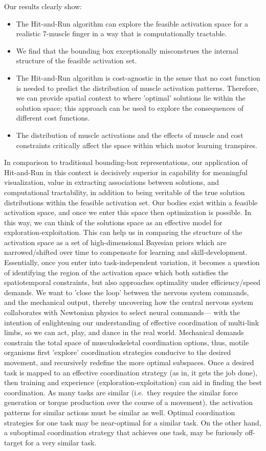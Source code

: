 Our results clearly show:
\begin{itemize}
	\item{The Hit-and-Run algorithm can explore the feasible activation space for a realistic 7-muscle finger in a way that is computationally tractable.}
	\item{We find that the bounding box exceptionally misconstrues the internal structure of the feasible activation set.}
	\item{The Hit-and-Run algorithm is cost-agnostic in the sense that no cost function is needed to predict the distribution of muscle activation patterns. Therefore, we can provide spatial context to where 'optimal' solutions lie within the solution space; this approach can be used to explore the consequences of different cost functions.}
	\item{The distribution of muscle activations and the effects of muscle and cost constraints critically affect the space within which motor learning transpires.}
\end{itemize}
In comparison to traditional bounding-box representations, our application of Hit-and-Run in this context is decisively superior in capability for meaningful visualization, value in extracting associations between solutions, and computational tractability, in addition to being veritable of the true solution distributions within the feasible activation set. Our bodies exist within a feasible activation space, and once we enter this space then optimization is possible. In this way, we can think of the solutions space as an effective model for exploration-exploitation.
This can help us in comparing the structure of the activation space as a set of high-dimensional Bayesian priors which are narrowed/shifted over time to compensate for learning and skill-development.
Essentially, once you enter into task-independent variation, it becomes a question of identifying the region of the activation space which both satisfies the spatiotemporal constraints, but also approaches optimality under efficiency/speed demands.
We want to 'close the loop' between the nervous system commands, and the mechanical output, thereby uncovering how the central nervous system collaborates with Newtonian physics to select neural commands--- with the intention of enlightening our understanding of effective coordination of multi-link limbs, so we can act, play, and dance in the real world.
Mechanical demands constrain the total space of musculoskeletal coordination options, thus, motile organisms first 'explore' coordination strategies conducive to the desired movement, and recursively redefine the more optimal subspaces.
Once a desired task is mapped to an effective coordination strategy (as in, it gets the job done), then training and experience (exploration-exploitation) can aid in finding the best coordination.
As many tasks are similar (i.e.\ they require the similar force generation or torque production over the course of a movement),  the activation patterns for similar actions must be similar as well.
Optimal coordination strategies for one task may be near-optimal for a similar task.
On the other hand, a suboptimal coordination strategy that achieves one task, may be furiously off-target for a very similar task.

